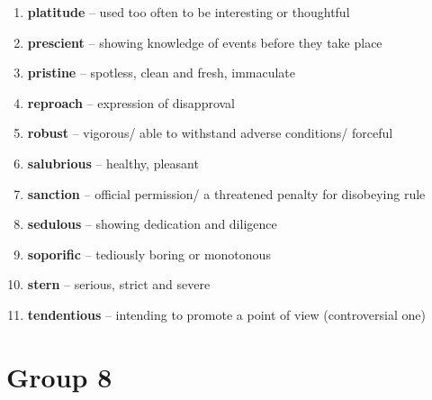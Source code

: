 \begin{enumerate}[wide,labelindent=0pt]
\item \textbf{platitude} -- used too often to be interesting or thoughtful
\item \textbf{prescient} -- showing knowledge of events before they take place
\item \textbf{pristine} -- spotless, clean and fresh, immaculate
\item \textbf{reproach} -- expression of disapproval
\item \textbf{robust} -- vigorous/ able to withstand adverse conditions/ forceful
\item \textbf{salubrious} -- healthy, pleasant
\item \textbf{sanction} -- official permission/ a threatened penalty for disobeying rule
\item \textbf{sedulous} -- showing dedication and diligence
\item \textbf{soporific} -- tediously boring or monotonous
\item \textbf{stern} -- serious, strict and severe
\item \textbf{tendentious} -- intending to promote a point of view (controversial one)
\end{enumerate}

\newpage
\section{Group 8}

